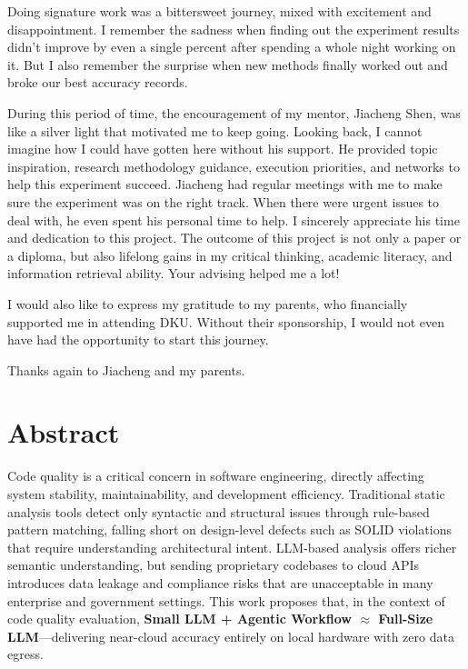\documentclass[12pt,a4paper,oneside]{report}
\begin{document}
Doing signature work was a bittersweet journey, mixed with excitement and disappointment. I remember the sadness when finding out the experiment results didn't improve by even a single percent after spending a whole night working on it. But I also remember the surprise when new methods finally worked out and broke our best accuracy records.

During this period of time, the encouragement of my mentor, Jiacheng Shen, was like a silver light that motivated me to keep going. Looking back, I cannot imagine how I could have gotten here without his support. He provided topic inspiration, research methodology guidance, execution priorities, and networks to help this experiment succeed. Jiacheng had regular meetings with me to make sure the experiment was on the right track. When there were urgent issues to deal with, he even spent his personal time to help. I sincerely appreciate his time and dedication to this project. The outcome of this project is not only a paper or a diploma, but also lifelong gains in my critical thinking, academic literacy, and information retrieval ability. Your advising helped me a lot!

I would also like to express my gratitude to my parents, who financially supported me in attending DKU. Without their sponsorship, I would not even have had the opportunity to start this journey.

Thanks again to Jiacheng and my parents.

\newpage

\chapter*{Abstract}

Code quality is a critical concern in software engineering, directly affecting system stability, maintainability, and development efficiency. Traditional static analysis tools detect only syntactic and structural issues through rule-based pattern matching, falling short on design-level defects such as SOLID violations that require understanding architectural intent. LLM-based analysis offers richer semantic understanding, but sending proprietary codebases to cloud APIs introduces data leakage and compliance risks that are unacceptable in many enterprise and government settings. This work proposes that, in the context of code quality evaluation, \textbf{Small LLM + Agentic Workflow $\approx$ Full-Size LLM}---delivering near-cloud accuracy entirely on local hardware with zero data egress.
\end{document}
